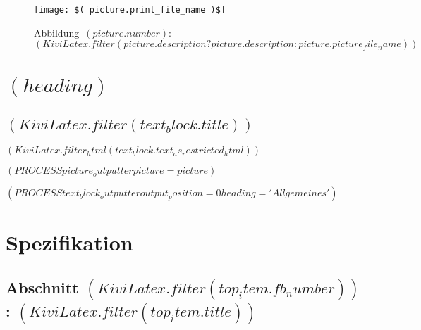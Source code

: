 \documentclass{scrartcl}
\begin{document}
\begin{CJK}{UTF8}{}
\begin{figure}[h!]
  \centering
  \texttt{[image: \$( picture.print\_file\_name )\$]}

\mbox{Abbildung $( picture.number )$: $( KiviLatex.filter(picture.description ? picture.description : picture.picture_file_name) )$}
\end{figure}


  \newpage

  \section{$( heading )$}


    \subsection{$( KiviLatex.filter(text_block.title) )$}

$( KiviLatex.filter_html(text_block.text_as_restricted_html) )$

$( PROCESS picture_outputter picture=picture )$


$( PROCESS text_block_outputter output_position=0 heading='Allgemeines' )$

\newpage

\section{Spezifikation}

\setlength{\LTpre}{-0.3cm}



  \subsection{Abschnitt $( KiviLatex.filter(top_item.fb_number) )$: $( KiviLatex.filter(top_item.title) )$}


\end{CJK}
\end{document}
